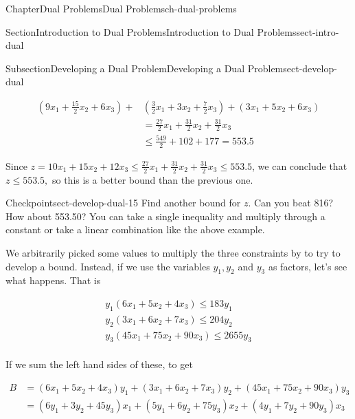 \documentclass[oneside,10pt,]{book}
\numberwithin{equation}{section}
\newcommand{\amp}{&}
\begin{document}
\begin{chapterptx}{Chapter}{Dual Problems}{}{Dual Problems}{}{}{ch-dual-problems}
\begin{sectionptx}{Section}{Introduction to Dual Problems}{}{Introduction to Dual Problems}{}{}{sect-intro-dual}
\begin{subsectionptx}{Subsection}{Developing a Dual Problem}{}{Developing a Dual Problem}{}{}{sect-develop-dual}
\par
%
\begin{equation*}
\begin{aligned} \left(9 x_1 + \frac{15}{2} x_2 + 6 x_3  \right) + \amp \left(\frac{3}{2}x_1 + 3 x_2 + \frac{7}{2} x_3 \right) + \left(3x_1 + 5x_2 + 6x_3 \right) \\ \amp = \frac{27}{2} x_1 + \frac{31}{2} x_2 + \frac{31}{2} x_3 \\ \amp \leq \frac{549}{2} + 102 + 177 = 553.5 \end{aligned}
\end{equation*}
%
\par
Since \(z = 10 x_1 + 15 x_2 + 12 x_3 \leq \frac{27}{2} x_1 + \frac{31}{2} x_2 + \frac{31}{2} x_3 \leq 553.5  \), we can conclude that \(z \leq 553.5,\) so this is a better bound than the previous one.%
\begin{inlineexercise}{Checkpoint}{}{sect-develop-dual-15}%
Find another bound for \(z\). Can you beat \textdollar{}816?  How about \textdollar{}553.50?  You can take a single inequality and multiply through a constant or take a linear combination like the above example.%
\end{inlineexercise}%
We arbitrarily picked some values to multiply the three constraints by to try to develop a bound. Instead, if we use the variables \(y_1, y_2\) and \(y_3\) as factors, let's see what happens. That is%
\par
%
\begin{equation}
\begin{aligned}y_1 (6x_1 + 5x_2 + 4x_3) \leq 183 y_1 \\ y_2 (3x_1 + 6x_2 + 7x_3) \leq 204 y_2 \\ y_3 (45x_1 + 75x_2 + 90x_3) \leq 2655 y_3 \\ \end{aligned}\label{eq-dual-linear-comb}
\end{equation}
%
\par
If we sum the left hand sides of these, to get%
\par
%
\begin{equation}
\begin{aligned}
B \amp = (6x_1 + 5x_2 + 4x_3) y_1 + (3x_1 + 6x_2 + 7x_3) y_2 + (45 x_1 + 75 x_2 + 90 x_3) y_3 \\
\amp =  (6y_1 + 3y_2 + 45y_3) x_1 + (5y_1 + 6y_2 + 75y_3) x_2 + (4y_1 + 7y_2 + 90 y_3) x_3 \\   \end{aligned}\label{eq-ex-dual-inequality-01}
\end{equation}

\end{subsectionptx}
\end{sectionptx}
\end{chapterptx}
\end{document}
